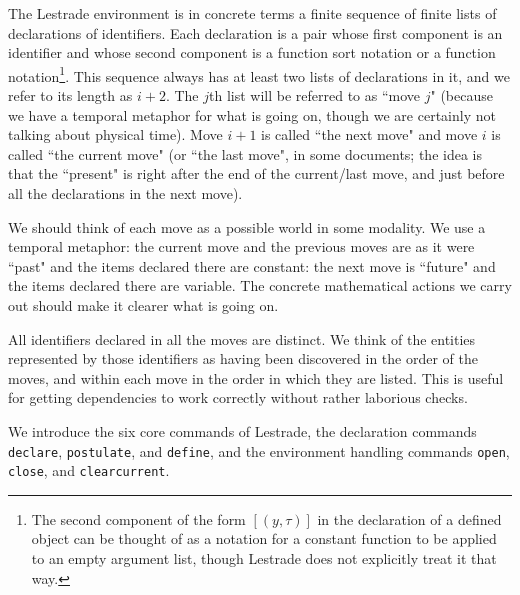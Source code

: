 \documentclass[12pt]{article}
\begin{document}
The Lestrade environment is in concrete terms a finite sequence of finite lists of declarations of identifiers.  Each declaration is a pair whose first component is  an identifier and whose second component is a function sort notation or a function notation\footnote{The second component of the form $[(y,\tau)]$ in the declaration of a defined object can be thought of as a notation for a constant function to be applied to an empty argument list, though Lestrade does not explicitly treat it that way.}.  This sequence always has at least two lists of declarations in it, and we refer to its length as $i+2$.  The $j$th list will be referred to as ``move $j$" (because we have a temporal metaphor for what is going on, though we are certainly not talking about physical time).  Move $i+1$ is called ``the next move" and move $i$ is called ``the current move" (or ``the last move", in some documents;  the idea is that the ``present" is right after the end of the current/last move, and just before all the declarations in the next move).

We should think of each move as a possible world in some modality.  We use a temporal metaphor:  the current move and the previous moves are as it were ``past" and the items declared there are constant:  the next move is ``future" and the items declared there are variable.  The concrete mathematical actions we carry out should make it clearer what is going on.

All identifiers declared in all the moves are distinct.  We think of the entities represented by those identifiers as having been discovered in the order of the moves, and within each move in the order in which they are listed.  This is useful for getting dependencies to work correctly without rather laborious checks.

We introduce the six core commands of Lestrade, the declaration commands {\tt declare}, {\tt postulate}, and {\tt define}, and the environment handling commands {\tt open}, {\tt close}, and {\tt clearcurrent}.
\end{document}
